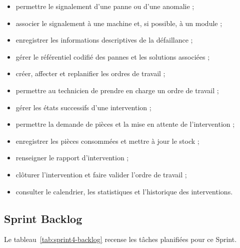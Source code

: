 \begin{itemize}
    \item permettre le signalement d'une panne ou d'une anomalie ;
    \item associer le signalement à une machine et, si possible, à un module ;
    \item enregistrer les informations descriptives de la défaillance ;
    \item gérer le référentiel codifié des pannes et les solutions associées ;
    \item créer, affecter et replanifier les ordres de travail ;
    \item permettre au technicien de prendre en charge un ordre de travail ;
    \item gérer les états successifs d'une intervention ;
    \item permettre la demande de pièces et la mise en attente de l'intervention ;
    \item enregistrer les pièces consommées et mettre à jour le stock ;
    \item renseigner le rapport d'intervention ;
    \item clôturer l'intervention et faire valider l'ordre de travail ;
    \item consulter le calendrier, les statistiques et l'historique des interventions.
\end{itemize}

\subsection{Sprint Backlog}

Le tableau~\ref{tab:sprint4-backlog} recense les tâches planifiées pour ce Sprint.

